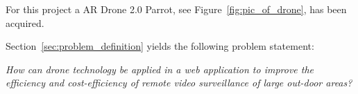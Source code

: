 For this project a AR Drone 2.0 Parrot, see Figure~\ref{fig:pic_of_drone}, has been acquired.

Section~\ref{sec:problem_definition} yields the following problem statement:

\textit{How can drone technology be applied in a web application to improve the efficiency and cost-efficiency of remote video surveillance of large out-door areas?}